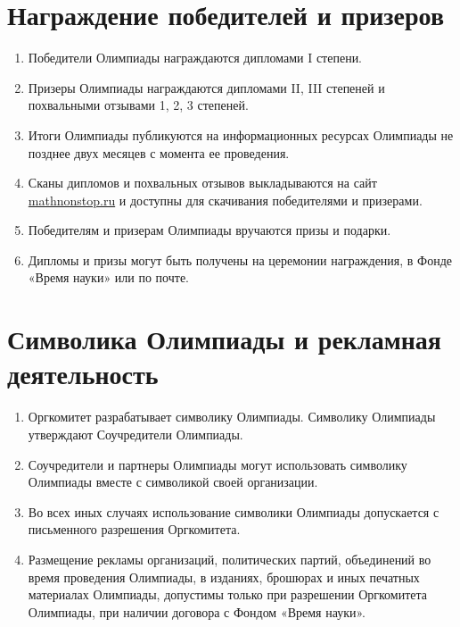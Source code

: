 \documentclass[a4paper,12pt]{article}
\newcommand{\surl}[1]{{\small\url{#1}}}
\begin{document}
\section{Награждение победителей и призеров}

\begin{enumerate}
	\item Победители Олимпиады награждаются дипломами I степени.
	\item Призеры Олимпиады награждаются дипломами II, III степеней и похвальными отзывами 1, 2, 3 степеней.
	\item Итоги Олимпиады публикуются на информационных ресурсах Олимпиады не позднее двух месяцев с момента ее проведения.
	\item Сканы дипломов и похвальных отзывов выкладываются на сайт \surl{mathnonstop.ru} и доступны для скачивания победителями и призерами.
	\item Победителям и призерам Олимпиады вручаются призы и подарки.
	\item Дипломы и призы могут быть получены на церемонии награждения, в Фонде «Время науки» или по почте.
\end{enumerate}

\section{Символика Олимпиады и рекламная деятельность}

\begin{enumerate}
	\item Оргкомитет разрабатывает символику Олимпиады. Символику
	   Олимпиады утверждают Соучредители Олимпиады.
	\item Соучредители и партнеры Олимпиады могут использовать
	   символику Олимпиады вместе с символикой своей организации.
	\item Во всех иных случаях использование символики Олимпиады
	   допускается с письменного разрешения Оргкомитета.
	\item Размещение рекламы организаций, политических партий,
	   объединений во время проведения Олимпиады, в изданиях,
	   брошюрах и иных печатных материалах Олимпиады, допустимы
	   только при разрешении Оргкомитета Олимпиады, при наличии
	   договора с Фондом «Время науки».
\end{enumerate}
\end{document}
